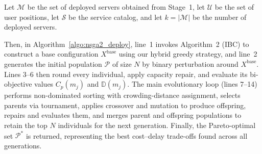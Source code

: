 \documentclass[10pt, conference, letterpaper]{IEEEtran}
\begin{document}


Let $\mathcal{M}$ be the set of deployed servers obtained from Stage~1, let $\mathcal{U}$ be the set of user positions, let $\mathcal{S}$ be the service catalog, and let $k=|\mathcal{M}|$ be the number of deployed servers.

  Then, in Algorithm~\ref{algo:nsga2_deploy}, line~1 invokes Algorithm~2 (IBC) to construct a base configuration
  $X^{\text{base}}$ using our hybrid greedy strategy, and line~2 generates the initial population $\mathcal{P}$ of size
  $N$ by binary perturbation around $X^{\text{base}}$. Lines 3--6 then round every individual, apply capacity repair,
  and evaluate its bi-objective values $C_{p}(m_{j})$ and $\mathbb{D}(m_{j})$. The main evolutionary loop (lines 7--14)
  performs non-dominated sorting with crowding-distance assignment, selects parents via tournament, applies crossover
  and mutation to produce offspring, repairs and evaluates them, and merges parent and offspring populations to retain
  the top $N$ individuals for the next generation. Finally, the Pareto-optimal set $\mathcal{P}^{*}$ is returned,
  representing the best cost--delay trade-offs found across all generations.
\end{document}
